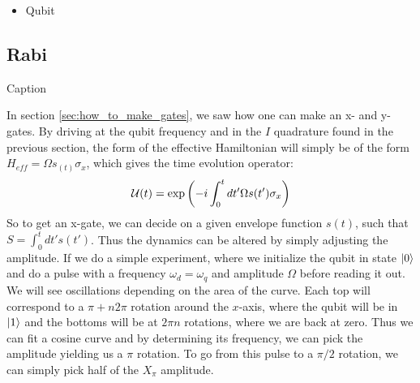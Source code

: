 \begin{itemize}
    \item Qubit 
\end{itemize}


\subsection{Rabi}
\begin{marginfigure}
    \centering
    \caption{Caption}
    \label{fig:enter-label}
\end{marginfigure}
In section \ref{sec:how_to_make_gates}, we saw how one can make an x- and y-gates. By driving at the qubit frequency and in the $I$ quadrature found in the previous section, the form of the effective Hamiltonian will simply be of the form $H_{eff} = \Omega s_(t) \sigma_x$, which gives the time evolution operator:
\begin{equation}
    \mathcal{U}(t) = \exp\left(-i\int_0^t dt' \Omega s(t') \sigma_x \right)
\end{equation}
So to get an x-gate, we can decide on a given envelope function $s(t)$, such that $S = \int_0^t  dt' s(t')$. Thus the dynamics can be altered by simply adjusting the amplitude. If we do a simple experiment, where we initialize the qubit in state $\ket{0}$ and do a pulse with a frequency $\omega_d = \omega_q$ and amplitude $\Omega$ before reading it out. We will see oscillations depending on the area of the curve. Each top will correspond to a $\pi +n2\pi$ rotation around the $x$-axis, where the qubit will be in $\ket{1}$ and the bottoms will be at $2\pi n$ rotations, where we are back at zero. Thus we can fit a cosine curve and by determining its frequency, we can pick the amplitude yielding us a $\pi$ rotation. To go from this pulse to a $\pi/2$ rotation, we can simply pick half of the $X_{\pi}$ amplitude.

